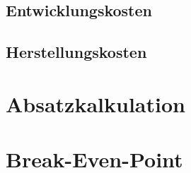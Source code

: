 \subsection{Entwicklungskosten}


\subsection{Herstellungskosten}


\section{Absatzkalkulation}


\section{Break-Even-Point}